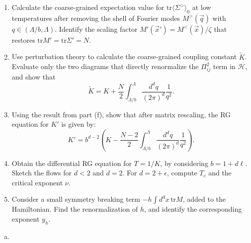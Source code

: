\begin{problem}
\begin{enumerate}
        \item[(f)] Calculate the coarse-grained expectation value for $\mathrm{tr}\langle\Sigma^>\rangle_0$ at low temperatures after removing the shell of Fourier modes $M^>(\vec{q})$ with $q \in (\Lambda/b, \Lambda)$. Identify the scaling factor $M'(\vec{x}') = M^<(\vec{x})/\zeta$ that restores $\mathrm{tr}M' = \mathrm{tr}\Sigma' = N$.

        \item[(g)] Use perturbation theory to calculate the coarse-grained coupling constant $\tilde{K}$. Evaluate only the two diagrams that directly renormalize the $\Pi_{ij}^2$ term in $\mathcal{H}$, and show that
        \[
            \tilde{K} = K + \frac{N}{2}\int_{\Lambda/b}^\Lambda\frac{d^dq}{(2\pi)^d}\frac{1}{q^2}.
        \]

        \item[(h)] Using the result from part (f), show that after matrix rescaling, the RG equation for $K'$ is given by:
        \[
            K' = b^{d-2}\left(K - \frac{N-2}{2}\int_{\Lambda/b}^\Lambda\frac{d^dq}{(2\pi)^d}\frac{1}{q^2}\right).
        \]

        \item[(i)] Obtain the differential RG equation for $T = 1/K$, by considering $b = 1 + d\ell$. Sketch the flows for $d < 2$ and $d = 2$. For $d = 2 + \epsilon$, compute $T_c$ and the critical exponent $\nu$.

        \item[(j)] Consider a small symmetry breaking term $-h\int d^dx\,\mathrm{tr}M$, added to the Hamiltonian. Find the renormalization of $h$, and identify the corresponding exponent $y_h$.
    \end{enumerate}
\end{problem}

\begin{solution}
    \begin{enumerate}[(a)]
        \item
    \end{enumerate}
\end{solution}


